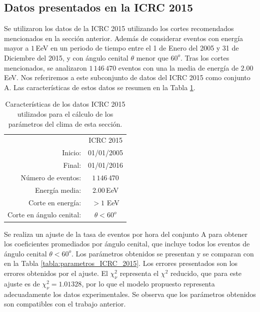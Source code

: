 
\subsection{Datos presentados en la ICRC 2015}\label{icrc2015}

Se utilizaron los datos de la ICRC 2015 utilizando los cortes recomendados mencionados en la sección anterior. Además de considerar eventos con energía mayor a $1\,$EeV en un periodo de tiempo entre el 1 de Enero del 2005 y 31 de Diciembre del 2015, y con ángulo cenital $\theta$ menor que $60^o$.  Tras los cortes mencionados, se analizaron $1\,146\,470$ eventos con una la media de energía de $2.00\,$EeV. Nos referiremos a este subconjunto de datos del ICRC 2015  como conjunto A. Las características de estos datos se resumen en la Tabla \ref{tabla:caracteristicas_ICRC_2015}.
        \begin{table}[H]
            \centering
            \begin{tabular}{r|c|} \cline{2-2}
                & ICRC  2015 \\ \cline{2-2}
            Inicio:              & 01/01/2005 \\ 
            Final:               & 01/01/2016  \\ 
            Número de eventos:   & $1\,146\,470$ \\ 
            Energía media:       & 2.00\,EeV    				\\ 
            Corte en energía:    & $> 1$ EeV        				\\ 
            Corte en ángulo cenital:		& $\theta < 60^o$ 				\\ \cline{2-2}
            \end{tabular}
        \caption{Características de los datos ICRC 2015 utilizados para el cálculo de los parámetros del clima de esta sección. } \label{tabla:caracteristicas_ICRC_2015}
        \end{table}

        Se realiza un ajuste de la tasa de eventos por hora del conjunto A para obtener los coeficientes promediados por ángulo cenital, que incluye todos los eventos de ángulo cenital $\theta< 60^o$. Los parámetros obtenidos se presentan y se comparan con \cite{aab2017impact} en la Tabla \ref{tabla:parametros_ICRC_2015}. Los errores presentados son los errores obtenidos por el ajuste. El $\chi^2_\nu$ representa el $\chi^2$ reducido, que para este ajuste es de $\chi^2_\nu=1.01328$, por lo que el modelo propuesto representa adecuadamente los datos experimentales. Se observa que los parámetros obtenidos son compatibles con el trabajo anterior.

